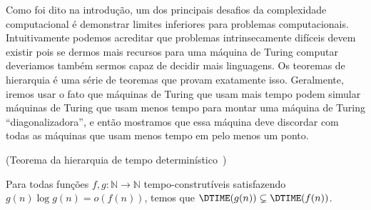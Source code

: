 Como foi dito na introdução, um dos principais desafios da complexidade computacional é demonstrar limites inferiores para problemas computacionais. Intuitivamente podemos acreditar que problemas intrinsecamente difíceis devem existir pois se dermos mais recursos para uma máquina de Turing computar deveriamos também sermos capaz de decidir mais linguagens. Os teoremas de hierarquia é uma série de teoremas que provam exatamente isso. Geralmente, iremos usar o fato que máquinas de Turing que usam mais tempo podem simular máquinas de Turing que usam menos tempo para montar uma máquina de Turing ``diagonalizadora'', e então mostramos que essa máquina deve discordar com todas as máquinas que usam menos tempo em pelo menos um ponto.


\begin{teo} (Teorema da hierarquia de tempo determinístico~\cite{hartmanis1965computational})

Para todas funções $f, g: \mathbb{N} \to \mathbb{N}$ tempo-construtíveis satisfazendo $g(n)\log g(n) = o(f(n))$, temos que $\DTIME(g(n)) \subsetneq \DTIME(f(n))$.

\end{teo}

